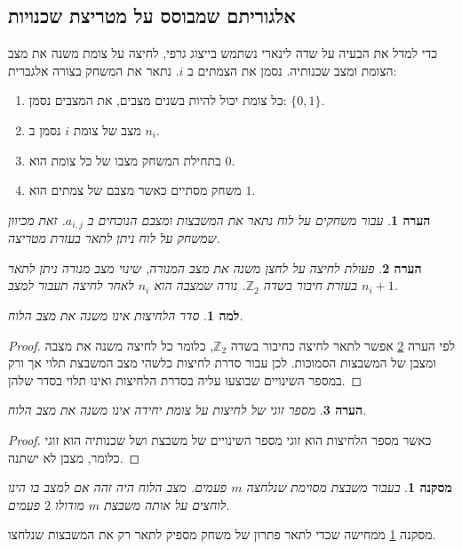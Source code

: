 \documentclass[12pt,leqno]{article}
\theoremstyle{theoremdd}
\newtheorem{corollary}{מסקנה}[section]
\newtheorem{lemma}{למה}[section]
\newtheorem{comm}{הערה}[section]
\begin{document}
\subsection{אלגוריתם שמבוסס על מטריצת שכנויות}
כדי למדל את הבעיה על שדה לינארי
נשתמש בייצוג גרפי, לחיצה על צומת משנה את מצב הצומת ומצב שכנותיה.
נסמן את הצמתים ב
$i$.
נתאר את המשחק בצורה אלגברית:
\begin{enumerate}
    \item 
כל צומת יכול להיות בשנים מצבים,
את המצבים נסמן:
    $\{0,1\}$.
    \item 
מצב של צומת 
    $i$
נסמן ב
    $n_i$.
    \item 
    בתחילת המשחק מצבו של כל צומת הוא 
    $0$.
    \item 
    משחק מסתיים כאשר מצבם של צמתים 
    הוא 
    $1$.
\end{enumerate}
\begin{comm}
    עבור משחקים על לוח נתאר את המשבצות ומצבם הנוכחים ב
    $a_{i,j}$.
    זאת מכיוון שמשחק על לוח ניתן לתאר בעזרת מטריצה.
\end{comm}
\begin{comm}
\label{comm: sum as press operator on board}
פעולת לחיצה על לחצן משנה 
את מצב המנורה,
שינוי מצב מנורה ניתן לתאר בעזרת חיבור בשדה 
$\mathbb{Z}_2$.
נורה שמצבה הוא
$n_i$
לאחר לחיצה תעבור למצב
$n_i + 1$.
\end{comm}
\begin{lemma}
    \label{lemma: order presses}
    סדר הלחיצות אינו משנה את מצב הלוח.
\end{lemma}
\begin{proof}
    לפי הערה
    \ref{comm: sum as press operator on board}
    אפשר לתאר לחיצה כחיבור
    בשדה
    $\mathbb{Z}_2$,
    כלומר כל לחיצה 
    משנה את מצבה ומצבן של המשבצות הסמוכות.
    לכן עבור סדרת לחיצות כלשהי מצב המשבצת
    תלוי אך ורק במספר השינויים שבוצעו עליה בסדרת הלחיצות
    ואינו תלוי בסדר שלהן. 
\end{proof}
\begin{comm}
    מספר זוגי של לחיצות על צומת יחידה אינו משנה את מצב הלוח.
\end{comm}
\begin{proof}
    כאשר מספר הלחיצות הוא זוגי מספר השינויים של משבצת
    ושל שכנותיה הוא זוגי כלומר, מצבן לא ישתנה.
\end{proof}
\begin{corollary}
    \label{corollary:gamplay-desc-single-press-key}
    בעבור משבצת מסוימת שנלחצה 
    $m$
    פעמים.
    מצב הלוח
    היה זהה אם 
    למצב בו הינו לוחצים 
    על אותה משבצת
    $m$
    מודולו
    $2$
    פעמים.
\end{corollary}
מסקנה
\ref{corollary:gamplay-desc-single-press-key}
ממחישה 
שכדי לתאר פתרון של משחק מספיק לתאר רק את המשבצות שנלחצו.
\end{document}
